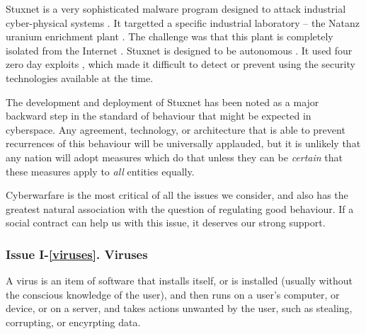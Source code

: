 

Stuxnet is a very sophisticated malware program designed to  attack  industrial
cyber-physical systems  \cite{karnouskos2011stuxnet}. It targetted
a specific industrial laboratory -- the Natanz uranium enrichment plant \cite{karnouskos2011stuxnet}.
The challenge was that this plant is completely isolated from the Internet
\cite{chen2010stuxnet}.  Stuxnet is designed to be autonomous \cite{kushner2013real}. 
It used four zero day exploits \cite{chen2010stuxnet}, which made it difficult to detect
or prevent using the security technologies available at the time.

The development and deployment of Stuxnet has been noted
as a major backward step in the standard of behaviour that might
be expected in cyberspace. Any agreement, technology, or architecture
that is able to prevent recurrences of this behaviour will
be universally applauded, but it is unlikely that any nation will
adopt measures which do that unless they can be {\em certain}
that these measures apply to {\em all} entities equally.

Cyberwarfare is the most critical of all the issues we consider, 
and also has the greatest natural association with the question of regulating
good behaviour. If a social contract can help us with this issue,
it deserves our strong support.



\subsubsection*{Issue I-\ref{viruses}. {Viruses}}\label{virusessol}
%
A virus is an item of software that installs itself, or is installed
(usually without the conscious knowledge of the user),
and then runs on a user's computer, or device, or on a server, and 
takes actions unwanted by the user, such as stealing, corrupting,
or encyrpting data.

